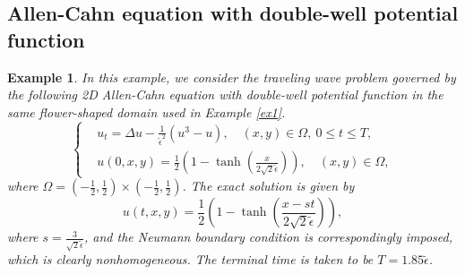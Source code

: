 \documentclass[3p,times]{elsarticle}
\newtheorem{example}{Example}[section]
\numberwithin{equation}{section}
\begin{document}
%	

\subsection{Allen-Cahn equation with double-well potential function}
\begin{example}
	\label{ex3}
	In this example, we consider the traveling wave problem governed by the following 2D Allen-Cahn equation with double-well potential function in the same flower-shaped domain used in Example \ref{ex1}.
	\begin{equation*}
		\label{Allen-Cahn}
		\left\{
		\begin{split}
			&u_t = \Delta u - \frac{1}{\widetilde{\epsilon}^2}(u^3-u), \quad (x,y)\in \Omega,\ 0\leq t\leq T,\\
			&u(0,x,y) = \frac 1 2 \left(1-\tanh\left(\frac{x}{2\sqrt{2}\widetilde{\epsilon}}\right)\right), \quad (x,y)\in \Omega,
		\end{split}
		\right.
	\end{equation*}
	where $\Omega=\left(-\frac1 2, \frac 1 2\right)\times\left(-\frac 1 2,\frac 1 2\right)$. The exact solution is given by
	\begin{equation*}
		u(t,x,y)=\frac{1}{2}\left(1-\tanh\left(\frac{x-st}{2\sqrt{2}\widetilde{\epsilon}}\right) \right),
	\end{equation*}
	where $s=\frac{3}{\sqrt{2}\widetilde{\epsilon}}$, and the Neumann boundary condition is correspondingly imposed, which is clearly nonhomogeneous. The terminal time is taken to be $T=1.85\widetilde{\epsilon}$.
\end{example}
\end{document}
